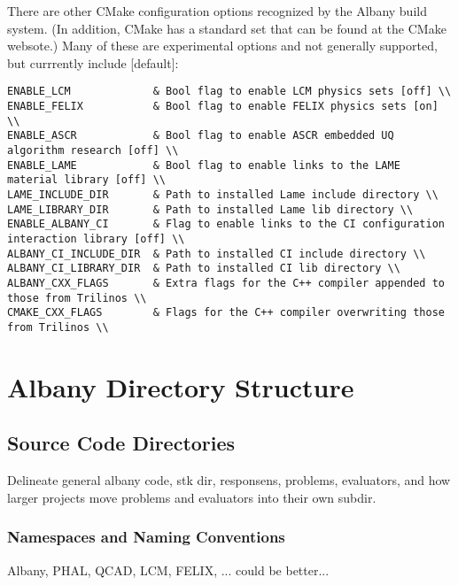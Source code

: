 \documentclass[pdf,12pt,report,strict]{SANDreport}
\theoremstyle{remark}
\begin{document}
There are other CMake configuration options recognized by the
Albany build system. (In addition, CMake has a standard set that
can be found at the CMake websote.) Many of these are experimental
options and not generally supported, but currrently include [default]:
\begin{verbatim}
ENABLE_LCM             & Bool flag to enable LCM physics sets [off] \\
ENABLE_FELIX           & Bool flag to enable FELIX physics sets [on] \\
ENABLE_ASCR            & Bool flag to enable ASCR embedded UQ algorithm research [off] \\
ENABLE_LAME            & Bool flag to enable links to the LAME material library [off] \\
LAME_INCLUDE_DIR       & Path to installed Lame include directory \\
LAME_LIBRARY_DIR       & Path to installed Lame lib directory \\
ENABLE_ALBANY_CI       & Flag to enable links to the CI configuration interaction library [off] \\
ALBANY_CI_INCLUDE_DIR  & Path to installed CI include directory \\
ALBANY_CI_LIBRARY_DIR  & Path to installed CI lib directory \\
ALBANY_CXX_FLAGS       & Extra flags for the C++ compiler appended to those from Trilinos \\
CMAKE_CXX_FLAGS        & Flags for the C++ compiler overwriting those from Trilinos \\
\end{verbatim}

\chapter{Albany Directory Structure}
\label{}
\section{Source Code Directories}
  Delineate general albany code, stk dir, responsens, problems, evaluators,
and how larger projects move problems and evaluators into their own subdir.

\subsection{Namespaces and Naming Conventions}
 Albany, PHAL, QCAD, LCM, FELIX, ...
 could be better...
\end{document}
